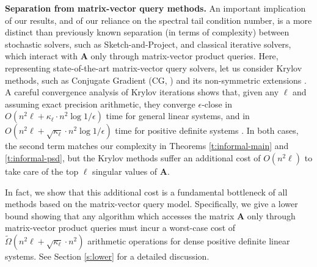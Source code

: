 \documentclass[11pt]{article}
\def\A{{\mathbf A}}
\begin{document}
\noindent
\textbf{Separation from matrix-vector query methods.}
An important implication of our results, and of our reliance on the spectral tail condition number, is a more distinct than previously known separation (in terms of complexity) between stochastic solvers, such as Sketch-and-Project, and classical iterative solvers, which interact with $\A$ only through matrix-vector product queries. Here, representing state-of-the-art matrix-vector query solvers, let us consider Krylov methods, such as Conjugate Gradient (CG, \cite{hestenes1952methods}) and its non-symmetric extensions \cite{saad1981krylov}. A careful convergence analysis of Krylov iterations shows that, given any $\ell$ and assuming exact precision arithmetic, they converge $\epsilon$-close in $O(n^2\ell+\kappa_\ell \cdot n^2\log1/\epsilon)$ time for general linear systems, and in $O(n^2\ell+\sqrt{\kappa_\ell}\cdot n^2\log1/\epsilon)$ time for positive definite systems \cite{axelsson1986rate,sw09}. In both cases, the second term matches our complexity in Theorems \ref{t:informal-main} and \ref{t:informal-psd}, but the Krylov methods suffer an additional cost of $O(n^2\ell)$ to take care of the top $\ell$ singular values of $\A$. 

In fact, we show that this additional cost is a fundamental bottleneck of all methods based on the matrix-vector query model. Specifically, we give a lower bound showing that any algorithm which accesses the matrix $\A$ only through matrix-vector product queries 
must incur a worst-case cost of $\tilde\Omega(n^2\ell + \sqrt{\kappa_\ell}\cdot n^2)$ arithmetic operations for dense positive definite linear systems. See Section \ref{s:lower} for a detailed discussion.
\end{document}
